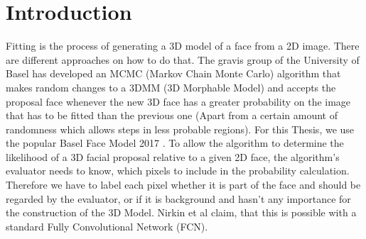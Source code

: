 \chapter{Introduction}
Fitting is the process of generating a 3D model of a face from a 2D image. There are different approaches on how to do that. The gravis group of the University of Basel has developed an MCMC (Markov Chain Monte Carlo) algorithm that makes random changes to a 3DMM (3D Morphable Model) and accepts the proposal face whenever the new 3D face has a greater probability on the image that has to be fitted than the previous one (Apart from a certain amount of randomness which allows steps in less probable regions). For this Thesis, we use the popular Basel Face Model 2017 \cite{BFM2017}. To allow the algorithm to determine the likelihood of a 3D facial proposal relative to a given 2D face, the algorithm's evaluator needs to know, which pixels to include in the probability calculation. Therefore we have to label each pixel whether it is part of the face and should be regarded by the evaluator, or if it is background and hasn't any importance for the construction of the 3D Model. Nirkin et al \cite{nirkin2018_faceswap} claim, that this is possible with a standard Fully Convolutional Network (FCN).

